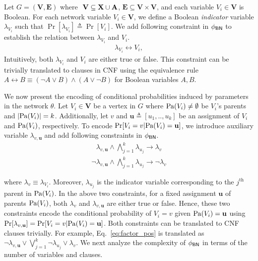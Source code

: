 Let  $ G = (\mathbf{V}, \mathbf{E}) $ where $  $  $ \mathbf{V} \subseteq \mathbf{X} \cup \mathbf{A} $, $ \mathbf{E} \subseteq \mathbf{V} \times \mathbf{V} $, and each variable $ V_i \in \mathbf{V} $ is Boolean. For each network variable $ V_i \in \mathbf{V} $, we define a Boolean \textit{indicator}  variable $ \lambda_{V_i} $ such that $ \Pr[\lambda_{V_i}] \triangleq \Pr[V_i] $. We add following constraint in $ \phi_{\mathsf{BN}} $ to establish the relation between $ \lambda_{V_i} $ and $ V_i $. 
\begin{align}
\lambda_{V_i} \leftrightarrow V_i,
\label{eq:indicator_constraint}
\end{align}
Intuitively, both $ \lambda_{V_i} $ and $ V_i $ are either true or false. This constraint can be trivially translated to clauses in CNF using the equivalence rule $ A \leftrightarrow B \equiv (\neg A \vee B)  \wedge (A \vee \neg B) $ for Boolean variables $ A, B$.

We now present the encoding of conditional probabilities induced by parameters in the network $ \theta $. Let $ V_i \in  \mathbf{V}  $  be a vertex in $ G $ where $ \mathrm{Pa}(V_i) \ne \emptyset $ be $ V_i $'s parents and $ |\mathrm{Pa}(V_i)| = k $. Additionally, let $ v $ and $ \mathbf{u} \triangleq [u_1,.., u_k] $ be an assignment of  $ V_i $ and $ \mathrm{Pa}(V_i)  $, respectively.  To encode $ \Pr[V_i = v| \mathrm{Pa}(V_i) = \mathbf{u}]$, we introduce auxiliary variable $ \lambda_{v,\mathbf{u}} $ and add following constraints in $ \phi_{\mathsf{BN}} $.
\begin{align}
\lambda_{v,\mathbf{u}}  \wedge \bigwedge_{j=1}^{k} \lambda_{u_j} \rightarrow \lambda_v
\label{eq:factor_pos}
\end{align}
\begin{align}
\neg \lambda_{v,\mathbf{u}}  \wedge \bigwedge_{j=1}^{k} \lambda_{u_j} \rightarrow \neg \lambda_v
\label{eq:factor_neg}
\end{align}

where $ \lambda_v \equiv \lambda_{V_i} $. Moreover, $ \lambda_{u_j} $ is the indicator variable corresponding to the $ j^\text{th} $ parent in $ \mathrm{Pa}(V_i) $. In the above two constraints,	for a fixed assignment $ \mathbf{u} $ of parents $ \mathrm{Pa}(V_i) $, both $ \lambda_v $ and $ \lambda_{v,\mathbf{u}} $ are either true or false.  Hence, these two constraints encode the conditional probability of $ V_i = v $ given $ \mathrm{Pa}(V_i) = \mathbf{u} $ using $ \Pr[\lambda_{v,\mathbf{u}}] = \Pr[V_i = v| \mathrm{Pa}(V_i) = \mathbf{u}]$. Both constraints can be translated to CNF clauses trivially. For example, Eq.~\ref{eq:factor_pos} is translated as $ \neg \lambda_{v,\mathbf{u}}  \vee \bigvee_{j=1}^{k} \neg \lambda_{u_j} \vee \lambda_v $. We next analyze the complexity of $ \phi_{\mathsf{BN}} $ in terms of the number of variables and clauses.

